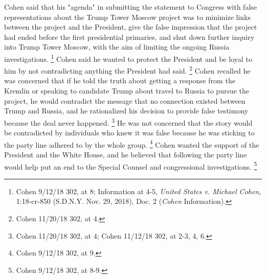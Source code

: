 {Cohen said that his "agenda" in submitting the statement to Congress with false representations about the Trump Tower Moscow project was to minimize links between the project and the President, give the false impression that the project had ended before the first presidential primaries, and shut down further inquiry into Trump Tower Moscow, with the aim of limiting the ongoing Russia investigations.%
\footnote{Cohen 9/12/18 302, at 8;
Information at 4-5, \textit{United States v. Michael Cohen}, 1:18-cr-850 (S.D.N.Y. Nov. 29, 2018), Doc. 2 (\textit{Cohen} Information).}
Cohen said he wanted to protect the President and be loyal to him by not contradicting anything the President had said.%
\footnote{Cohen 11/20/18 302, at 4.}
Cohen recalled he was concerned that if he told the truth about getting a response from the Kremlin or speaking to candidate Trump about travel to Russia to pursue the project, he would contradict the message that no connection existed between Trump and Russia, and he rationalized his decision to provide false testimony because the deal never happened.%
\footnote{Cohen 11/20/18 302, at 4;
Cohen 11/12/18 302, at 2-3, 4, 6.}
He was not concerned that the story would be contradicted by individuals who knew it was false because he was sticking to the party line adhered to by the whole group.%
\footnote{Cohen 9/12/18 302, at 9.}
Cohen wanted the support of the President and the White House, and he believed that following the party line would help put an end to the Special Counsel and congressional investigations.%
\footnote{Cohen 9/12/18 302, at 8-9.}

}
